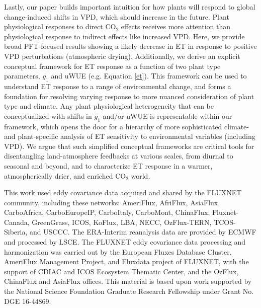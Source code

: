\documentclass[draft,linenumbers]{gcbjournal}
\begin{document}
Lastly, our paper builds important intuition for how plants will respond to global change-induced shifts in VPD, which should increase in the future. Plant physiological responses to direct CO$_2$ effects \citep[e.g.,][]{Swann_2016} receives more attention than physiological response to indirect effects like increased VPD. Here, we provide broad PFT-focused results showing a likely decrease in ET in response to positive VPD perturbations (atmospheric drying). Additionally, we derive an explicit conceptual framework for ET response as a function of two plant type parameters, $g_1$ and uWUE (e.g. Equation \ref{et}). This framework can be used to understand ET response to a range of environmental change, and forms a foundation for resolving varying response to more nuanced consideration of plant type and climate. Any plant physiological heterogeneity that can be conceptualized with shifts in $g_1$ \citep[e.g.][]{Lin_2015} and/or uWUE \citep[e.g.][]{Zhou_2014} is representable within our framework, which opens the door for a hierarchy of more sophisticated climate- and plant-specific analysis of ET sensitivity to environmental variables (including VPD). We argue that such simplified conceptual frameworks are critical tools for disentangling land-atmosphere feedbacks at various scales, from diurnal to seasonal and beyond, and to characterize ET response in a warmer, atmospherically drier, and enriched CO$_2$ world. 


\acknowledgments
This work used eddy covariance data acquired and shared by the FLUXNET community, including these networks: AmeriFlux, AfriFlux, AsiaFlux, CarboAfrica, CarboEuropeIP, CarboItaly, CarboMont, ChinaFlux, Fluxnet-Canada, GreenGrass, ICOS, KoFlux, LBA, NECC, OzFlux-TERN, TCOS-Siberia, and USCCC. The ERA-Interim reanalysis data are provided by ECMWF and processed by LSCE. The FLUXNET eddy covariance data processing and harmonization was carried out by the European Fluxes Database Cluster, AmeriFlux Management Project, and Fluxdata project of FLUXNET, with the support of CDIAC and ICOS Ecosystem Thematic Center, and the OzFlux, ChinaFlux and AsiaFlux offices. This material is based upon work supported by the National Science Foundation Graduate Research Fellowship under Grant No. DGE 16-44869.



\end{document}
